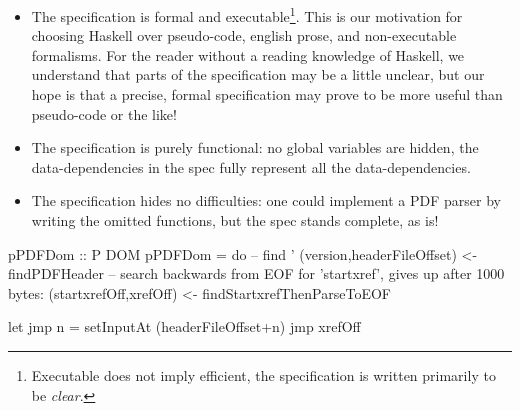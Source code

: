 \begin{itemize}
\item The specification is formal and executable\footnote{
  Executable does not imply efficient, the specification is written
  primarily to be \emph{clear}.}.
  This is our motivation for choosing Haskell over pseudo-code, english prose,
  and non-executable formalisms.  For the reader without a reading knowledge of
  Haskell, we understand that parts of the specification may be a little
  unclear, but our hope is that a precise, formal specification may prove to be
  more useful than pseudo-code or the like!
  
\item The specification is purely functional: no global variables are hidden,
  the data-dependencies in the spec fully represent all the data-dependencies.
  
\item The specification hides no difficulties: one could implement a PDF parser
  by writing the omitted functions, but the spec stands complete, as is!
\end{itemize}


\begin{code}
pPDFDom :: P DOM
pPDFDom =
    do
    -- find '%
    (version,headerFileOffset) <- findPDFHeader
    -- search backwards from EOF for 'startxref', gives up after 1000 bytes:
    (startxrefOff,xrefOff) <- findStartxrefThenParseToEOF
\end{code}

  
\begin{code}  
    let jmp n = setInputAt (headerFileOffset+n)
    jmp xrefOff
\end{code}

  

